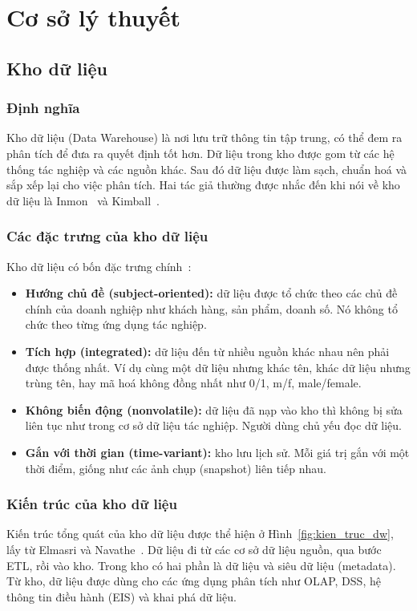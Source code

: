 \section{Cơ sở lý thuyết}
\subsection{Kho dữ liệu}
\subsubsection{Định nghĩa}
Kho dữ liệu (Data Warehouse) là nơi lưu trữ thông tin tập trung, có thể đem ra phân tích để đưa ra quyết định tốt hơn. Dữ liệu trong kho được gom từ các hệ thống tác nghiệp và các nguồn khác. Sau đó dữ liệu được làm sạch, chuẩn hoá và sắp xếp lại cho việc phân tích. Hai tác giả thường được nhắc đến khi nói về kho dữ liệu là Inmon~\cite{inmon2005} và Kimball~\cite{kimball2013}.

\subsubsection{Các đặc trưng của kho dữ liệu}
Kho dữ liệu có bốn đặc trưng chính~\cite{inmon2005}:
\begin{itemize}
    \item \textbf{Hướng chủ đề (subject-oriented):} dữ liệu được tổ chức theo các chủ đề chính của doanh nghiệp như khách hàng, sản phẩm, doanh số. Nó không tổ chức theo từng ứng dụng tác nghiệp.
    \item \textbf{Tích hợp (integrated):} dữ liệu đến từ nhiều nguồn khác nhau nên phải được thống nhất. Ví dụ cùng một dữ liệu nhưng khác tên, khác dữ liệu nhưng trùng tên, hay mã hoá không đồng nhất như 0/1, m/f, male/female.
    \item \textbf{Không biến động (nonvolatile):} dữ liệu đã nạp vào kho thì không bị sửa liên tục như trong cơ sở dữ liệu tác nghiệp. Người dùng chủ yếu đọc dữ liệu.
    \item \textbf{Gắn với thời gian (time-variant):} kho lưu lịch sử. Mỗi giá trị gắn với một thời điểm, giống như các ảnh chụp (snapshot) liên tiếp nhau.
\end{itemize}

\subsubsection{Kiến trúc của kho dữ liệu}
Kiến trúc tổng quát của kho dữ liệu được thể hiện ở Hình~\ref{fig:kien_truc_dw}, lấy từ Elmasri và Navathe~\cite{elmasri2016}. Dữ liệu đi từ các cơ sở dữ liệu nguồn, qua bước ETL, rồi vào kho. Trong kho có hai phần là dữ liệu và siêu dữ liệu (metadata). Từ kho, dữ liệu được dùng cho các ứng dụng phân tích như OLAP, DSS, hệ thông tin điều hành (EIS) và khai phá dữ liệu.

